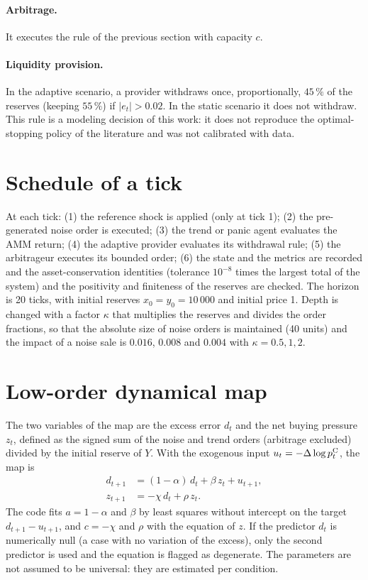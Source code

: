 \paragraph{Arbitrage.} It executes the rule of the previous section with capacity $c$.

\paragraph{Liquidity provision.} In the adaptive scenario, a provider withdraws once, proportionally, $45\,\%$ of the reserves (keeping $55\,\%$) if $|e_t|>0.02$. In the static scenario it does not withdraw. This rule is a modeling decision of this work: it does not reproduce the optimal-stopping policy of the literature \cite{bergault2025exit} and was not calibrated with data.

\section{Schedule of a tick}

At each tick: (1) the reference shock is applied (only at tick 1); (2) the pre-generated noise order is executed; (3) the trend or panic agent evaluates the AMM return; (4) the adaptive provider evaluates its withdrawal rule; (5) the arbitrageur executes its bounded order; (6) the state and the metrics are recorded and the asset-conservation identities (tolerance $10^{-8}$ times the largest total of the system) and the positivity and finiteness of the reserves are checked. The horizon is 20 ticks, with initial reserves $x_0=y_0=10\,000$ and initial price 1. Depth is changed with a factor $\kappa$ that multiplies the reserves and divides the order fractions, so that the absolute size of noise orders is maintained (40 units) and the impact of a noise sale is $0.016$, $0.008$ and $0.004$ with $\kappa=0.5,1,2$.

\section{Low-order dynamical map}

The two variables of the map are the excess error $d_t$ and the net buying pressure $z_t$, defined as the signed sum of the noise and trend orders (arbitrage excluded) divided by the initial reserve of $Y$. With the exogenous input $u_t=-\Delta\log p^{\mathrm{C}}_t$, the map is
\begin{align}
  d_{t+1} &= (1-\alpha)\,d_t + \beta\,z_t + u_{t+1}, \label{eq:mapa-d}\\
  z_{t+1} &= -\chi\,d_t + \rho\,z_t. \label{eq:mapa-z}
\end{align}
The code fits $a=1-\alpha$ and $\beta$ by least squares without intercept on the target $d_{t+1}-u_{t+1}$, and $c=-\chi$ and $\rho$ with the equation of $z$. If the predictor $d_t$ is numerically null (a case with no variation of the excess), only the second predictor is used and the equation is flagged as degenerate. The parameters are not assumed to be universal: they are estimated per condition.

